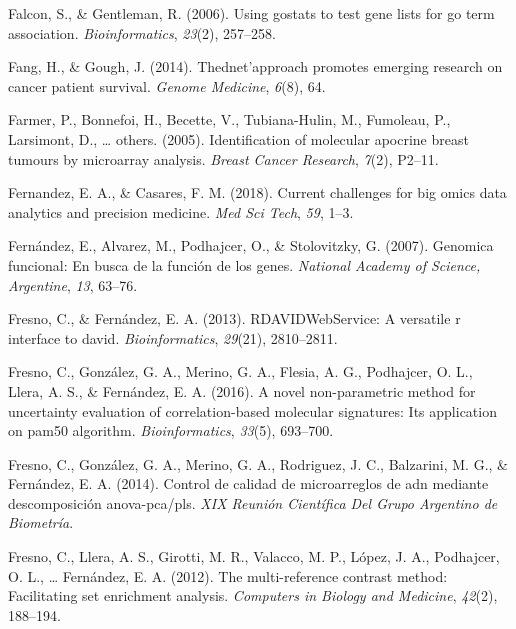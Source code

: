 \documentclass[12pt,twoside]{reedthesis}
\begin{document}
\leavevmode\hypertarget{ref-falcon2006using}{}%
Falcon, S., \& Gentleman, R. (2006). Using gostats to test gene lists for go term association. \emph{Bioinformatics}, \emph{23}(2), 257--258.

\leavevmode\hypertarget{ref-fang2014thednet}{}%
Fang, H., \& Gough, J. (2014). Thednet'approach promotes emerging research on cancer patient survival. \emph{Genome Medicine}, \emph{6}(8), 64.

\leavevmode\hypertarget{ref-farmer2005identification}{}%
Farmer, P., Bonnefoi, H., Becette, V., Tubiana-Hulin, M., Fumoleau, P., Larsimont, D., \ldots{} others. (2005). Identification of molecular apocrine breast tumours by microarray analysis. \emph{Breast Cancer Research}, \emph{7}(2), P2--11.

\leavevmode\hypertarget{ref-fernandez2018current}{}%
Fernandez, E. A., \& Casares, F. M. (2018). Current challenges for big omics data analytics and precision medicine. \emph{Med Sci Tech}, \emph{59}, 1--3.

\leavevmode\hypertarget{ref-fernandez2007genomica}{}%
Fernández, E., Alvarez, M., Podhajcer, O., \& Stolovitzky, G. (2007). Genomica funcional: En busca de la función de los genes. \emph{National Academy of Science, Argentine}, \emph{13}, 63--76.

\leavevmode\hypertarget{ref-fresno2013rdavidwebservice}{}%
Fresno, C., \& Fernández, E. A. (2013). RDAVIDWebService: A versatile r interface to david. \emph{Bioinformatics}, \emph{29}(21), 2810--2811.

\leavevmode\hypertarget{ref-fresno2016novel}{}%
Fresno, C., González, G. A., Merino, G. A., Flesia, A. G., Podhajcer, O. L., Llera, A. S., \& Fernández, E. A. (2016). A novel non-parametric method for uncertainty evaluation of correlation-based molecular signatures: Its application on pam50 algorithm. \emph{Bioinformatics}, \emph{33}(5), 693--700.

\leavevmode\hypertarget{ref-fresnocontrol}{}%
Fresno, C., González, G. A., Merino, G. A., Rodriguez, J. C., Balzarini, M. G., \& Fernández, E. A. (2014). Control de calidad de microarreglos de adn mediante descomposición anova-pca/pls. \emph{XIX Reunión Científica Del Grupo Argentino de Biometría}.

\leavevmode\hypertarget{ref-fresno2012multi}{}%
Fresno, C., Llera, A. S., Girotti, M. R., Valacco, M. P., López, J. A., Podhajcer, O. L., \ldots{} Fernández, E. A. (2012). The multi-reference contrast method: Facilitating set enrichment analysis. \emph{Computers in Biology and Medicine}, \emph{42}(2), 188--194.
\end{document}
